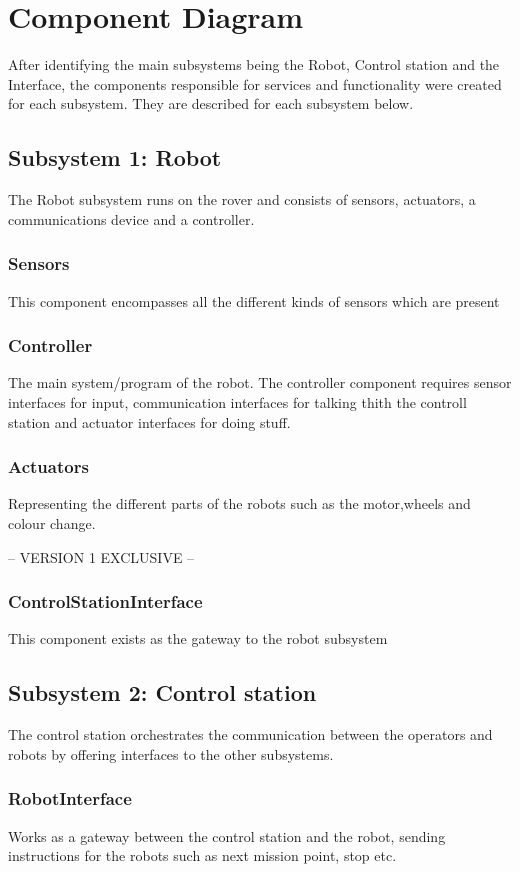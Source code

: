 \section{Component Diagram}
After identifying the main subsystems being the Robot, Control station and the Interface, the components responsible for services and functionality were created for each subsystem. They are described for each subsystem below.
\subsection*{Subsystem 1: Robot}
The Robot subsystem runs on the rover and consists of sensors, actuators, a communications device and a controller.
\subsubsection*{Sensors}
This component encompasses all the different kinds of sensors which are present 

\subsubsection*{Controller}
The main system/program of the robot. The controller component requires sensor interfaces for input, communication interfaces for talking thith the controll station and actuator interfaces for doing stuff.

\subsubsection{Actuators}
Representing the different parts of the robots such as the motor,wheels and colour change.

-- VERSION 1 EXCLUSIVE --
\subsubsection{ControlStationInterface}
This component exists as the gateway to the robot subsystem 

\subsection*{Subsystem 2: Control station}
The control station orchestrates the communication between the operators and robots by offering interfaces to the other subsystems.
\subsubsection*{RobotInterface}
Works as a gateway between the control station and the robot, sending instructions for the robots such as next mission point, stop etc.
